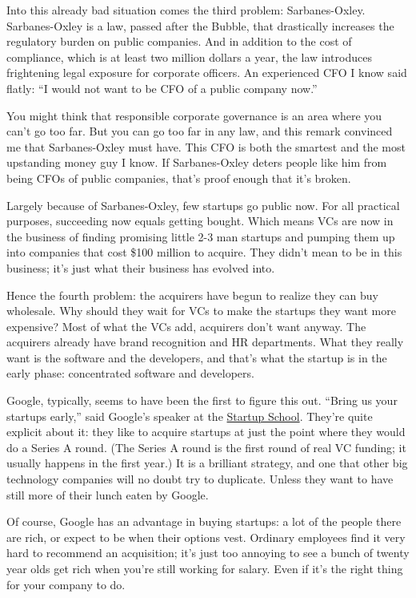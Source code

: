Into this already bad situation comes the third problem: Sarbanes-Oxley.
Sarbanes-Oxley is a law, passed after the Bubble, that drastically
increases the regulatory burden on public companies. And in addition to
the cost of compliance, which is at least two million dollars a year,
the law introduces frightening legal exposure for corporate officers. An
experienced CFO I know said flatly: ``I would not want to be CFO of a
public company now.''

You might think that responsible corporate governance is an area where
you can't go too far. But you can go too far in any law, and this remark
convinced me that Sarbanes-Oxley must have. This CFO is both the
smartest and the most upstanding money guy I know. If Sarbanes-Oxley
deters people like him from being CFOs of public companies, that's proof
enough that it's broken.

Largely because of Sarbanes-Oxley, few startups go public now. For all
practical purposes, succeeding now equals getting bought. Which means
VCs are now in the business of finding promising little 2-3 man startups
and pumping them up into companies that cost \$100 million to acquire.
They didn't mean to be in this business; it's just what their business
has evolved into.

Hence the fourth problem: the acquirers have begun to realize they can
buy wholesale. Why should they wait for VCs to make the startups they
want more expensive? Most of what the VCs add, acquirers don't want
anyway. The acquirers already have brand recognition and HR departments.
What they really want is the software and the developers, and that's
what the startup is in the early phase: concentrated software and
developers.

Google, typically, seems to have been the first to figure this out.
``Bring us your startups early,'' said Google's speaker at the
\href{http://startupschool.org}{Startup School}. They're quite explicit
about it: they like to acquire startups at just the point where they
would do a Series A round. (The Series A round is the first round of
real VC funding; it usually happens in the first year.) It is a
brilliant strategy, and one that other big technology companies will no
doubt try to duplicate. Unless they want to have still more of their
lunch eaten by Google.

Of course, Google has an advantage in buying startups: a lot of the
people there are rich, or expect to be when their options vest. Ordinary
employees find it very hard to recommend an acquisition; it's just too
annoying to see a bunch of twenty year olds get rich when you're still
working for salary. Even if it's the right thing for your company to do.

